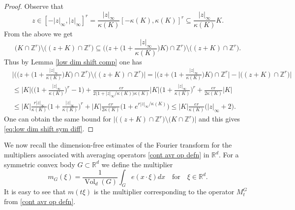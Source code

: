 \documentclass[a4paper,oneside, reqno]{amsart}
\numberwithin{equation}{section}
\theoremstyle{definition}%
\theoremstyle{definition}
\theoremstyle{definition}%
\theoremstyle{definition}
\newcommand{\Z}{\mathbb{Z}}
\newcommand{\R}{\mathbb{R}}
\DeclareMathOperator{\Vol}{Vol}
\begin{document}
\begin{proof}
Observe that
\[
z \in [-|z|_{\infty},|z|_\infty]^r = \frac{|z|_{\infty}}{\kappa(K)} [-\kappa(K),\kappa(K)]^r \subseteq \frac{|z|_{\infty}}{\kappa(K)}K.
\]
From the above we get
\[
\big(K\cap\Z^r\big)\setminus\big((z+K)\cap\Z^r\big)\subseteq
\bigg(\Big(z+\Big(1+\frac{|z|_{\infty}}{\kappa(K)}\Big)K\Big)\cap\Z^r\bigg)\setminus\Big((z+K)\cap\Z^r\Big). 
\]
Thus by Lemma \ref{low dim shift comp} one has
\begin{align*}
  &\bigg|\bigg(\Big(z+\Big(1+\frac{|z|_{\infty}}{\kappa(K)}\Big)K\Big)\cap\Z^r\bigg)\setminus\Big((z+K)\cap\Z^r\Big)\bigg|=
\bigg|\Big(z+\Big(1+\frac{|z|_{\infty}}{\kappa(K)}\Big)K\Big)\cap\Z^r\bigg|-\big|\big((z+K)\cap\Z^r\big)\big|\\                    &\le|K|\bigg(\Big(1+ \frac{|z|_{\infty}}{\kappa(K)}\Big)^r-1\bigg)+\frac{er}{2(1+|z|_{\infty}/\kappa(K)\big)\kappa(K)}|K|\Big(1+ \frac{|z|_{\infty}}{\kappa(K)}\Big)^r+\frac{er}{2\kappa(K)}|K|\\
&\le|K| \frac{r|z|_{\infty}}{\kappa(K)}\Big(1+ \frac{|z|_{\infty}}{\kappa(K)}\Big)^r+ |K|\frac{er}{2\kappa(K)} \big(1+e^{r|z|_{\infty}/\kappa(K)}\big) \le|K|\frac{er}{\kappa(K)}\Big(|z|_{\infty}+2\Big) .
\end{align*}
One can obtain the same bound for
$\big|\big((z+K)\cap\Z^r\big)\setminus\big(K\cap\Z^r\big)\big|$
and this gives \eqref{eq:low dim shift sym diff}.
\end{proof}

We now recall the dimension-free estimates of the Fourier transform for the multipliers associated with averaging operators \eqref{cont avr op defn} in $\R^d$. For a symmetric convex body $G\subset \R^d$ we define the multiplier 
\[
m_G(\xi)=\frac{1}{\Vol_d(G)}\int_G e(x \cdot \xi) d x\quad\text{for}\quad \xi\in \R^d.
\] 
It is easy to see that $m(t\xi)$ is the multiplier corresponding to the operator $M_t^G$ from \eqref{cont avr op defn}.
\end{document}
